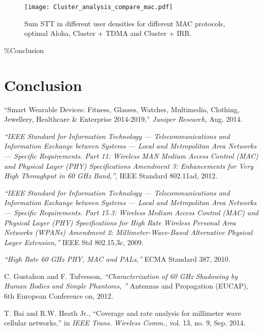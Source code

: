\documentclass[10pt, conference, letterpaper]{IEEEtran}
\begin{document}
\begin{figure}
	\centering
	\texttt{[image: Cluster\_analysis\_compare\_mac.pdf]}
	\caption{Sum STT in different user densities for different MAC protocols, optimal Aloha, Cluster + TDMA and Cluster + IRR.}
	\label{fig:clusteranalysis:compare_mac}
\end{figure}

\%Conclusion

\section{Conclusion}\label{section:conclusion}


\begin{thebibliography}{50}
``Smart Wearable Devices: Fitness, Glasses, Watches, Multimedia, Clothing, Jewellery, Healthcare \& Enterprise 2014-2019,'' \emph{Juniper Research}, Aug. 2014.

\emph{``IEEE Standard for Information Technology — Telecommunications and Information Exchange between Systems — Local and Metropolitan Area Networks — Specific Requirements. Part 11: Wireless MAN Medium Access Control (MAC) and Physical Layer (PHY) Specifications Amendment 3: Enhancements for Very High Throughput in 60 GHz Band,''}, IEEE Standard 802.11ad, 2012.

\emph{``IEEE Standard for Information Technology — Telecommunications and Information Exchange between Systems — Local and Metropolitan Area Networks — Specific Requirements. Part 15.3: Wireless Medium Access Control (MAC) and Physical Layer (PHY) Specifications for High Rate Wireless Personal Area Networks (WPANs) Amendment 2: Millimeter-Wave-Based Alternative Physical Layer Extension,''} IEEE Std 802.15.3c, 2009.

\emph{``High Rate 60 GHz PHY, MAC and PALs,''} ECMA Standard 387, 2010.


C. Gustafson and F. Tufvesson, \emph{``Characterization of 60 GHz Shadowing by Human Bodies and Simple Phantoms, ''} Antennas and Propagation (EUCAP), 6th European Conference on, 2012.

T. Bai and R.W. Heath Jr., ``Coverage and rate analysis for millimeter wave cellular networks,'' in \emph{IEEE Trans. Wireless Comm.}, vol. 13, no. 9, Sep. 2014.


\end{thebibliography}
\end{document}
